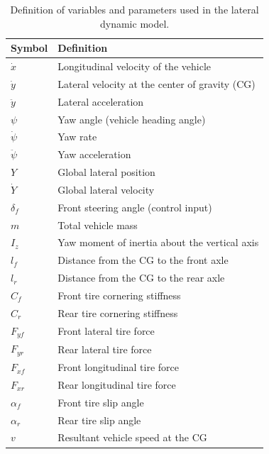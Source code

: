 \documentclass{ifacconf}
\begin{document}
\begin{table}[htbp]
\centering
\caption{Definition of variables and parameters used in the lateral dynamic model.}
\label{tab:model_variables}
\begin{tabular}{ll}
\hline
Symbol & Definition \\
\hline
$\dot{x}$      & Longitudinal velocity of the vehicle \\
$\dot{y}$      & Lateral velocity at the center of gravity (CG) \\
$\ddot{y}$     & Lateral acceleration \\
$\psi$         & Yaw angle (vehicle heading angle) \\
$\dot{\psi}$   & Yaw rate \\
$\ddot{\psi}$  & Yaw acceleration \\
$Y$            & Global lateral position \\
$\dot{Y}$      & Global lateral velocity \\
$\delta_f$     & Front steering angle (control input) \\
$m$            & Total vehicle mass \\
$I_z$          & Yaw moment of inertia about the vertical axis \\
$l_f$          & Distance from the CG to the front axle \\
$l_r$          & Distance from the CG to the rear axle \\
$C_f$          & Front tire cornering stiffness \\
$C_r$          & Rear tire cornering stiffness \\
$F_{yf}$       & Front lateral tire force \\
$F_{yr}$       & Rear lateral tire force \\
$F_{xf}$       & Front longitudinal tire force \\
$F_{xr}$       & Rear longitudinal tire force \\
$\alpha_f$     & Front tire slip angle \\
$\alpha_r$     & Rear tire slip angle \\
$v$            & Resultant vehicle speed at the CG \\
\hline
\end{tabular}
\end{table}
\end{document}
